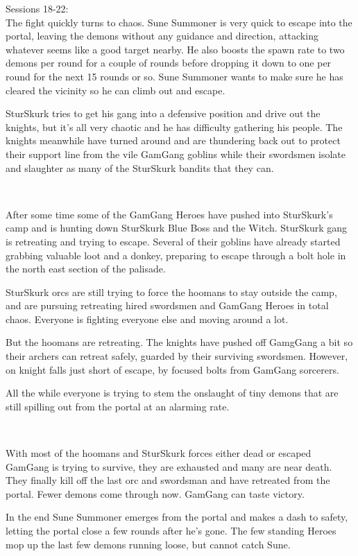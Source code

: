 Sessions 18-22:\\
The fight quickly turns to chaos. Sune Summoner is very quick to escape into the portal, leaving the demons without any guidance and direction, attacking whatever seems like a good target nearby. He also boosts the spawn rate to two demons per round for a couple of rounds before dropping it down to one per round for the next 15 rounds or so. Sune Summoner wants to make sure he has cleared the vicinity so he can climb out and escape.

SturSkurk tries to get his gang into a defensive position and drive out the knights, but it's all very chaotic and he has difficulty gathering his people. The knights meanwhile have turned around and are thundering back out to protect their support line from the vile GamGang goblins while their swordsmen isolate and slaughter as many of the SturSkurk bandits that they can.

\

After some time some of the GamGang Heroes have pushed into SturSkurk's camp and is hunting down SturSkurk Blue Boss and the Witch. SturSkurk gang is retreating and trying to escape. Several of their goblins have already started grabbing valuable loot and a donkey, preparing to escape through a bolt hole in the north east section of the palisade.

SturSkurk orcs are still trying to force the hoomans to stay outside the camp, and are pursuing retreating hired swordsmen and GamGang Heroes in total chaos. Everyone is fighting everyone else and moving around a lot.

But the hoomans are retreating. The knights have pushed off GamgGang a bit so their archers can retreat safely, guarded by their surviving swordsmen. However, on knight falls just short of escape, by focused bolts from GamGang sorcerers.

All the while everyone is trying to stem the onslaught of tiny demons that are still spilling out from the portal at an alarming rate.

\

With most of the hoomans and SturSkurk forces either dead or escaped GamGang is trying to survive, they are exhausted and many are near death. They finally kill off the last orc and swordsman and have retreated from the portal. Fewer demons come through now. GamGang can taste victory.

In the end Sune Summoner emerges from the portal and makes a dash to safety, letting the portal close a few rounds after he's gone. The few standing Heroes mop up the last few demons running loose, but cannot catch Sune.

